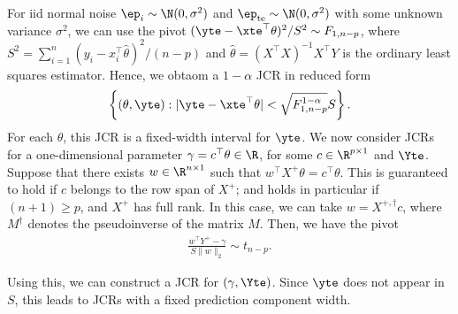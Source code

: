 \documentclass[english]{article}
\begin{document}
\begin{example}
For iid normal noise  $\ep_i \sim \N(0,\sigma^2)$ and $\ep_{\mathrm{te}} \sim \N(0, \sigma^2)$ with some unknown variance $\sigma^2$, 
we can 
use the pivot ${(\yte - \xte^\top \theta)^2}/{S^2} \sim F_{1,n-p}$, where $S^2 = \sum_{i=1}^n (y_i - x_i^\top \hat{\theta})^2 / (n-p)$ and $\hat{\theta} = (X^\top X)^{-1} X^\top Y$ is the ordinary least squares estimator. 
Hence, we obtaom a $1-\alpha$ JCR in reduced form
\begin{align}\label{eq:pivot-F-1}
    \left\{ (\theta,\yte):   |\yte - \xte^\top \theta| < \sqrt{F_{1,n-p}^{1 - \alpha}}S \right\}.
    \end{align}
For each $\theta$, this JCR is a fixed-width interval for $\yte$.
We now consider JCRs for a one-dimensional parameter
$\gamma = c^\top \theta \in \R$, for some $c \in \R^{ p \times 1}$ and $\Yte$.
Suppose that there exists $w \in \R^{n \times 1}$ such that $w^\top X^{+} \theta = c^\top \theta$.
This is guaranteed to hold if $c$ 
belongs to the row span of $X^+$; 
and holds in particular if $(n+1) \ge p$, and
$X^+$ has full rank.
In this case, we can take $w = X^{+,\dagger}c$, where $M^{\dagger}$ denotes the pseudoinverse of the matrix $M$. 
Then, we have the pivot
\begin{align}\label{eq:gau_high_d}
\frac{w^\top Y^{+} - \gamma}{S\|w\|_2} \sim t_{n-p}.
\end{align}

Using this, we can construct a JCR for $(\gamma,\Yte)$.
Since $\yte$ does not appear in $S$, this leads to JCRs with a fixed prediction component width. 
\end{example}
\end{document}
